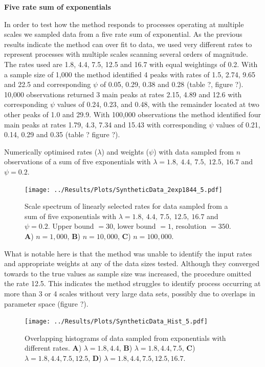 \documentclass[11pt,usenames,dvipsnames]{article}
\begin{document}
\noindent
\textbf{Five rate sum of exponentials}

In order to test how the method responds to processes operating at multiple scales we sampled data from a five rate sum of exponential. As the previous results indicate the method can over fit to data, we used very different rates to represent processes with multiple scales scanning several orders of magnitude. The rates used are 1.8, 4.4, 7.5, 12.5 and 16.7 with equal weightings of 0.2. With a sample size of 1,000 the method identified 4 peaks with rates of 1.5, 2.74, 9.65 and 22.5 and corresponding $\psi$ of 0.05, 0.29, 0.38 and 0.28 (table ?, figure ?). 10,000 observations returned 3 main peaks at rates 2.15, 4.89 and 12.6 with corresponding $\psi$ values of 0.24, 0.23, and 0.48, with the remainder located at two other peaks of 1.0 and 29.9. With 100,000 observations the method identified four main peaks at rates 1.79, 4.3, 7.34 and 15.43 with corresponding $\psi$ values of 0.21, 0.14, 0.29 and 0.35 (table ? figure ?). 

\begin{table}[H]
	\centering
	\caption{Numerically optimised rates ($\lambda$) and weights ($\psi$) with data sampled from $n$ observations of a sum of five exponentials with $\lambda = 1.8,\ 4.4,\ 7.5,\ 12.5,\ 16.7$ and $\psi = 0.2$.}
	
\end{table}
\begin{figure}[H]
	\centering
	\texttt{[image: ../Results/Plots/SyntheticData\_2exp1844\_5.pdf]}
	\caption{Scale spectrum of linearly selected rates for data sampled from a sum of five exponentials with $\lambda = 1.8,\ 4.4,\ 7.5,\ 12.5,\ 16.7$ and $\psi = 0.2$. Upper bound $= 30$, lower bound $= 1$, resolution $= 350$. \textbf{A}) $n = 1,000$, \textbf{B}) $n = 10,000$,  \textbf{C}) $n = 100,000$.}
\end{figure}

What is notable here is that the method was unable to identify the input rates and appropriate weights at any of the data sizes tested. Although they converged towards to the true values as sample size was increased, the procedure omitted the rate 12.5. This indicates the method struggles to identify process occurring at more than 3 or 4 scales without very large data sets, possibly due to overlaps in parameter space (figure ?).

\begin{figure}[H]
	\centering
	\texttt{[image: ../Results/Plots/SyntheticData\_Hist\_5.pdf]}
	\caption{Overlapping histograms of data sampled from exponentials with different rates. \textbf{A}) $\lambda = 1.8, 4.4$, \textbf{B}) $\lambda = 1.8, 4.4, 7.5$, \textbf{C}) $\lambda = 1.8, 4.4, 7.5, 12.5$, \textbf{D}) $\lambda = 1.8, 4.4, 7.5, 12.5, 16.7$.}
\end{figure}
\end{document}

